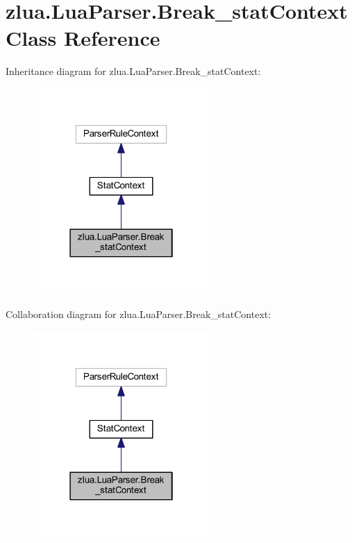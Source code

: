 \hypertarget{classzlua_1_1_lua_parser_1_1_break__stat_context}{}\section{zlua.\+Lua\+Parser.\+Break\+\_\+stat\+Context Class Reference}
\label{classzlua_1_1_lua_parser_1_1_break__stat_context}


Inheritance diagram for zlua.\+Lua\+Parser.\+Break\+\_\+stat\+Context\+:
\nopagebreak
\begin{figure}[H]
\begin{center}
\leavevmode
\includegraphics[width=190pt]{classzlua_1_1_lua_parser_1_1_break__stat_context__inherit__graph}
\end{center}
\end{figure}


Collaboration diagram for zlua.\+Lua\+Parser.\+Break\+\_\+stat\+Context\+:
\nopagebreak
\begin{figure}[H]
\begin{center}
\leavevmode
\includegraphics[width=190pt]{classzlua_1_1_lua_parser_1_1_break__stat_context__coll__graph}
\end{center}
\end{figure}
